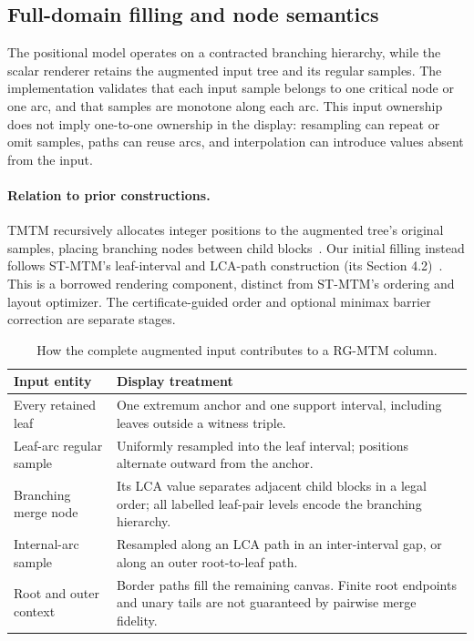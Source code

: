 \subsection{Full-domain filling and node semantics}\label{sec:supp_filling}
The positional model operates on a contracted branching hierarchy, while the scalar renderer retains the augmented input tree and its regular samples. The implementation validates that each input sample belongs to one critical node or one arc, and that samples are monotone along each arc. This input ownership does not imply one-to-one ownership in the display: resampling can repeat or omit samples, paths can reuse arcs, and interpolation can introduce values absent from the input.

\paragraph{Relation to prior constructions.}
TMTM recursively allocates integer positions to the augmented tree's original samples, placing branching nodes between child blocks~\cite{Koepp:2023:TMTM}. Our initial filling instead follows ST-MTM's leaf-interval and LCA-path construction (its Section 4.2)~\cite{STMTM:2026}. This is a borrowed rendering component, distinct from ST-MTM's ordering and layout optimizer. The certificate-guided order and optional minimax barrier correction are separate stages.

\begin{table}[H]\centering\small
\caption{How the complete augmented input contributes to a RG-MTM column.}\label{tab:node_semantics}
\begin{tabular}{p{.22\linewidth}p{.70\linewidth}}\toprule
Input entity & Display treatment\\\midrule
Every retained leaf & One extremum anchor and one support interval, including leaves outside a witness triple.\\
Leaf-arc regular sample & Uniformly resampled into the leaf interval; positions alternate outward from the anchor.\\
Branching merge node & Its LCA value separates adjacent child blocks in a legal order; all labelled leaf-pair levels encode the branching hierarchy.\\
Internal-arc sample & Resampled along an LCA path in an inter-interval gap, or along an outer root-to-leaf path.\\
Root and outer context & Border paths fill the remaining canvas. Finite root endpoints and unary tails are not guaranteed by pairwise merge fidelity.\\\bottomrule
\end{tabular}
\end{table}


